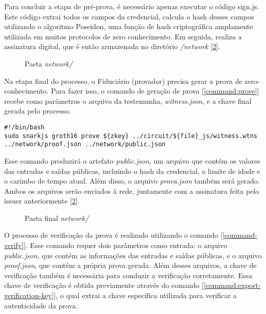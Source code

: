 Para concluir a etapa de pré-prova, é necessário apenas executar o código sign.js. Este código extrai todos os campos da credencial, calcula o hash desses campos utilizando o algoritmo Poseidon, uma função de hash criptográfica amplamente utilizada em muitos protocolos de  zero conhecimento. Em seguida, realiza a assinatura digital, que  é então armazenada no diretório \textit{/network} [\ref{fig:network-folder}].

\begin{figure}[h]
    \centering
    \begin{minipage}{.2\textwidth}
    \end{minipage}
    \caption{Pasta \textit{network/}}
    \label{fig:network-folder}
\end{figure}


Na etapa final do processo, o Fiduciário (provador) precisa gerar a prova de zero-conhecimento. Para fazer isso, o comando de geração de prova [\ref{command:prove}] recebe como parâmetros o arquivo da testemunha, \textit{witness.json}, e a chave final gerada pelo processo.

\begin{lstlisting}[style=shell, caption={Comando de compilação do circuito}, label=command:prove]
#!/bin/bash
sudo snarkjs groth16 prove ${zkey} ../circuit/${file}_js/witness.wtns ../network/proof.json ../network/public.json
\end{lstlisting}

Esse comando produzirá o artefato \textit{public.json}, um arquivo que contém os valores das entradas e saídas públicas, incluindo o hash da credencial, o limite de idade e o carimbo de tempo atual. Além disso, o arquivo \textit{prova.json} também será gerado. Ambos os arquivos serão enviados à rede, juntamente com a assinatura feita pelo issuer anteriormente [\ref{fig:network-folder}].

\begin{figure}[h]
    \centering
    \begin{minipage}{.2\textwidth}
    \end{minipage}
    \caption{Pasta final \textit{network/}}
    \label{fig:network-folder}
\end{figure}

O processo de verificação da prova é realizado utilizando o comando [\ref{command-verify}]. Esse comando requer dois parâmetros como entrada: o arquivo \textit{public.json}, que contém as informações das entradas e saídas públicas, e o arquivo \textit{proof.json}, que contém a própria prova gerada. Além desses arquivos, a chave de verificação também é necessária para conduzir a verificação corretamente. Essa chave de verificação é obtida previamente através do comando [\ref{command:export-verification-key}], o qual extrai a chave específica utilizada para verificar a autenticidade da prova. 

